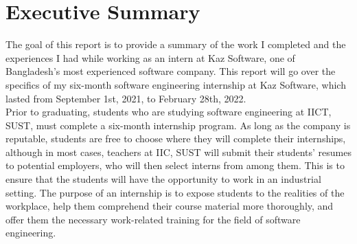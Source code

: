 \chapter*{Executive Summary}

The goal of this report is to provide a summary of the work I completed and the experiences I had while working as an intern at Kaz Software, one of Bangladesh's most experienced software company.
This report will go over the specifics of my six-month software engineering internship at Kaz Software, which lasted from September 1st, 2021, to February 28th, 2022.\\


Prior to graduating, students who are studying software engineering at IICT, SUST, must complete a six-month internship program.
As long as the company is reputable, students are free to choose where they will complete their internships, although in most cases, teachers at IIC, SUST will submit their students' resumes to potential employers, who will then select interns from among them.
This is to ensure that the students will have the opportunity to work in an industrial setting.
The purpose of an internship is to expose students to the realities of the workplace, help them comprehend their course material more thoroughly, and offer them the necessary work-related training for the field of software engineering.